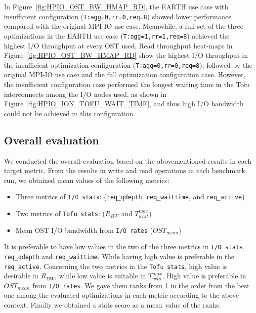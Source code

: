 \documentclass{jhps}
\begin{document}
%
In Figure~\ref{fig:HPIO_OST_BW_HMAP_RD}, the EARTH use case with insufficient configuration
({\tt T:agg=0,rr=0,req=8}) showed lower performance compared with the original MPI-IO use case.
Meanwhile, a full set of the three optimizations in the EARTH use case
({\tt T:agg=1,rr=1,req=8}) achieved the highest I/O throughput at every OST used.
Read throughput heat-maps in Figure~\ref{fig:HPIO_OST_BW_HMAP_RD} show
the highest I/O throughput in the insufficient optimization configuration
({\tt T:agg=0,rr=0,req=8}), followed by the original MPI-IO use case
and the full optimization configuration case.
However, the insufficient configuration case performed the longest waiting time
in the Tofu interconnects among the I/O nodes used,
as shown in Figure~\ref{fig:HPIO_ION_TOFU_WAIT_TIME},
and thus high I/O bandwidth could not be achieved in this configuration.


\subsection{Overall evaluation}
\label{ssec:overall_eval}

We conducted the overall evaluation based on the abovementioned results
in each target metric.
From the results in write and read operations in each benchmark run,
we obtained mean values of the following metrics:
%
\begin{itemize}
\item Three metrics of {\tt I/O stats}:
({\tt req\_qdepth}, {\tt req\_waittime}, and {\tt req\_active})
\item Two metrics of {\tt Tofu stats}: ($R_{BW}$ and $T_{wait}^{max}$)
\item Mean OST I/O bandwidth from {\tt I/O rates} ($OST_{mean}$)
\end{itemize}
%
It is preferable to have low values in the two of the three metrics
in {\tt I/O stats}, {\tt req\_qdepth} and {\tt req\_waittime}.
While having high value is preferable in the {\tt req\_active}.
Concerning the two metrics in the {\tt Tofu stats},
high value is desirable in $R_{BW}$, while low value is
suitable in $T_{wait}^{max}$.
High value is preferable in $OST_{mean}$ from {\tt I/O rates}.
We gave them ranks from 1 in the order from the best one
among the evaluated optimizations in each metric according to
the above context.
Finally we obtained a stats score as a mean value of the ranks.
\end{document}
